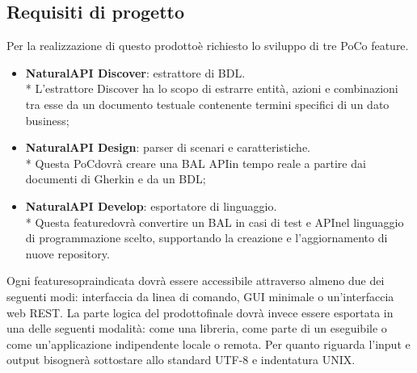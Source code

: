 \subsection{Requisiti di progetto}
Per la realizzazione di questo prodotto\glosp è richiesto lo sviluppo di tre PoC\glosp o feature\glo.
\begin{itemize}
	\item \textbf{NaturalAPI Discover}: estrattore di BDL. \\*
	L'estrattore Discover ha lo scopo di estrarre entità, azioni e combinazioni tra esse da un documento testuale contenente termini specifici di un dato business;
	\item \textbf{NaturalAPI Design}: parser di scenari e caratteristiche. \\*
	Questa PoC\glosp dovrà creare una BAL API\glosp in tempo reale a partire dai documenti di Gherkin e da un BDL;
	\item \textbf{NaturalAPI Develop}: esportatore di linguaggio. \\*
	Questa feature\glosp dovrà convertire un BAL in casi di test e API\glosp nel linguaggio di programmazione scelto, supportando la creazione e l'aggiornamento di nuove repository\glo.
\end{itemize}
Ogni feature\glosp sopraindicata dovrà essere accessibile attraverso almeno due dei seguenti modi: interfaccia da linea di comando, GUI minimale o un'interfaccia web REST\glo. La parte logica del prodotto\glosp finale dovrà invece essere esportata in una delle seguenti modalità: come una libreria, come parte di un eseguibile o come un'applicazione indipendente locale o remota. 
Per quanto riguarda l'input e output bisognerà sottostare allo standard UTF-8 e indentatura UNIX. 

